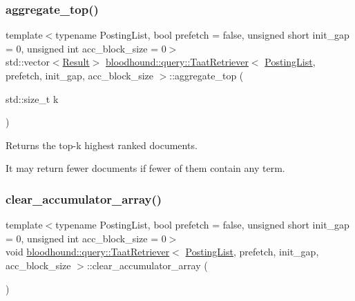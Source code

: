 \subsubsection{\texorpdfstring{aggregate\+\_\+top()}{aggregate\_top()}}
{\footnotesize\ttfamily template$<$typename Posting\+List, bool prefetch = false, unsigned short init\+\_\+gap = 0, unsigned int acc\+\_\+block\+\_\+size = 0$>$ \\
std\+::vector$<$\mbox{\hyperlink{structbloodhound_1_1query_1_1Result}{Result}}$>$ \mbox{\hyperlink{classbloodhound_1_1query_1_1TaatRetriever}{bloodhound\+::query\+::\+Taat\+Retriever}}$<$ \mbox{\hyperlink{classbloodhound_1_1PostingList}{Posting\+List}}, prefetch, init\+\_\+gap, acc\+\_\+block\+\_\+size $>$\+::aggregate\+\_\+top (\begin{DoxyParamCaption}\item[{std\+::size\+\_\+t}]{k }\end{DoxyParamCaption})\hspace{0.3cm}{\ttfamily [inline]}}

Returns the top-\/k highest ranked documents.

It may return fewer documents if fewer of them contain any term. \mbox{\label{classbloodhound_1_1query_1_1TaatRetriever_a6fedf448e3d9394ecaa787bf60a9cb84}} 
\subsubsection{\texorpdfstring{clear\+\_\+accumulator\+\_\+array()}{clear\_accumulator\_array()}}
{\footnotesize\ttfamily template$<$typename Posting\+List, bool prefetch = false, unsigned short init\+\_\+gap = 0, unsigned int acc\+\_\+block\+\_\+size = 0$>$ \\
void \mbox{\hyperlink{classbloodhound_1_1query_1_1TaatRetriever}{bloodhound\+::query\+::\+Taat\+Retriever}}$<$ \mbox{\hyperlink{classbloodhound_1_1PostingList}{Posting\+List}}, prefetch, init\+\_\+gap, acc\+\_\+block\+\_\+size $>$\+::clear\+\_\+accumulator\+\_\+array (\begin{DoxyParamCaption}{ }\end{DoxyParamCaption})\hspace{0.3cm}{\ttfamily [inline]}}



